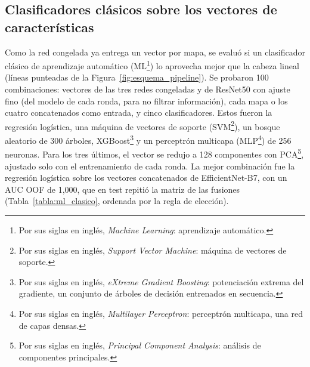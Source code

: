     \subsection{Clasificadores clásicos sobre los vectores de características}

        Como la red congelada ya entrega un vector por mapa, se evaluó si un clasificador clásico de aprendizaje automático (ML\footnote{Por sus siglas en inglés, \textit{Machine Learning}: aprendizaje automático.}) lo aprovecha mejor que la cabeza lineal (líneas punteadas de la Figura~\ref{fig:esquema_pipeline}). Se probaron 100 combinaciones: vectores de las tres redes congeladas y de ResNet50 con ajuste fino (del modelo de cada ronda, para no filtrar información), cada mapa o los cuatro concatenados como entrada, y cinco clasificadores. Estos fueron la regresión logística, una máquina de vectores de soporte (SVM\footnote{Por sus siglas en inglés, \textit{Support Vector Machine}: máquina de vectores de soporte.}), un bosque aleatorio de 300 árboles, XGBoost\footnote{Por sus siglas en inglés, \textit{eXtreme Gradient Boosting}: potenciación extrema del gradiente, un conjunto de árboles de decisión entrenados en secuencia.} y un perceptrón multicapa (MLP\footnote{Por sus siglas en inglés, \textit{Multilayer Perceptron}: perceptrón multicapa, una red de capas densas.}) de 256 neuronas. Para los tres últimos, el vector se redujo a 128 componentes con PCA\footnote{Por sus siglas en inglés, \textit{Principal Component Analysis}: análisis de componentes principales.}, ajustado solo con el entrenamiento de cada ronda. La mejor combinación fue la regresión logística sobre los vectores concatenados de EfficientNet-B7, con un AUC OOF de 1,000, que en test repitió la matriz de las fusiones (Tabla~\ref{tabla:ml_clasico}, ordenada por la regla de elección).

